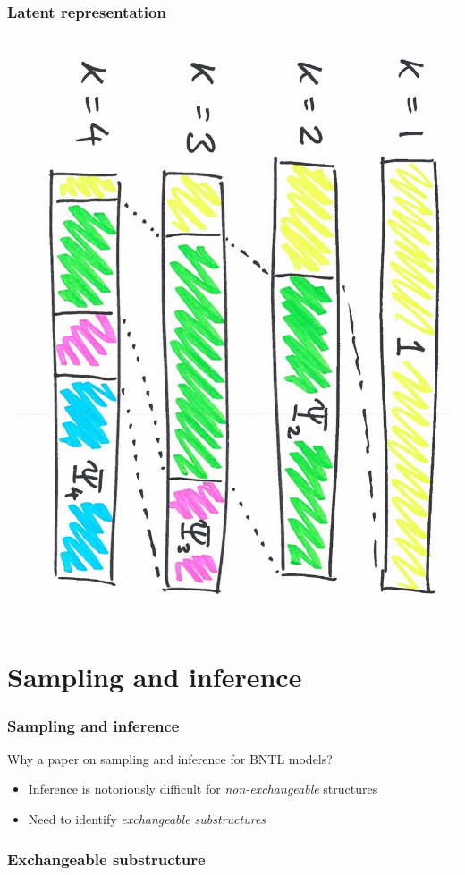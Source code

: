 \documentclass[final,hyperref={pdfpagelabels=false},noamsthm]{beamer}
\begin{document}
\begin{frame}
	\frametitle{Latent representation}
	\includegraphics[angle=90,origin=c,scale=0.4]{fig/recursivescaling}
\end{frame}


\section{Sampling and inference}
\begin{frame}
	\frametitle{Sampling and inference}
	Why a paper on sampling and inference for BNTL models?
	\pause
	\begin{itemize}
		\item Inference is notoriously difficult for \textit{non-exchangeable} structures
		\item Need to identify \textit{exchangeable substructures}
	\end{itemize}
\end{frame}

\begin{frame}
	\frametitle{Exchangeable substructure}
	\begin{center}
		\resizebox{\textwidth}{!}{}
	\end{center}
\end{frame}
\end{document}
